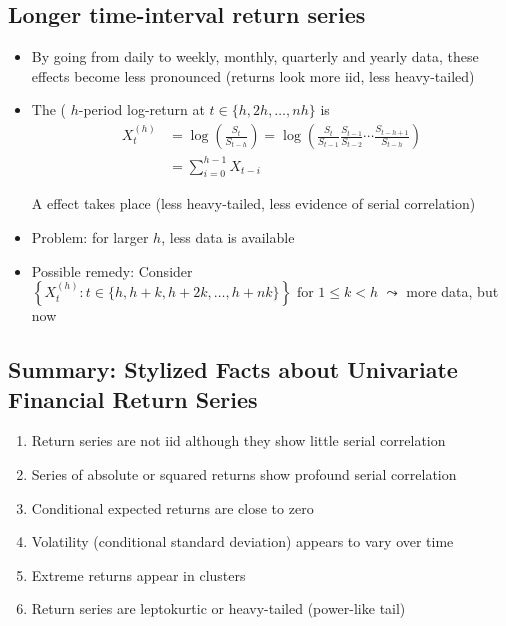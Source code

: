 \subsection*{Longer time-interval return series}
\begin{itemize}[leftmargin=*]
    \item By going from daily to weekly, monthly, quarterly and yearly data, these effects become less pronounced (returns look more iid, less heavy-tailed)
    \item The ( $h$-period log-return at $t \in\{h, 2 h, \ldots, n h\}$ is
$$
\begin{aligned}
    X_{t}^{(h)}&=\log \left(\frac{S_{t}}{S_{t-h}}\right)=\log \left(\frac{S_{t}}{S_{t-1}} \frac{S_{t-1}}{S_{t-2}} \cdots \frac{S_{t-h+1}}{S_{t-h}}\right) \\
    &=\sum_{i=0}^{h-1} X_{t-i}
\end{aligned}
$$

A  effect takes place (less heavy-tailed, less evidence of serial correlation)
    \item Problem: for larger $h$, less data is available
    \item Possible remedy: Consider 
$
\left\{X_{t}^{(h)}: t \in\{h, h+k, h+2 k, \ldots, h+n k\}\right\} \text { for } 1 \leq k<h
$
$\leadsto$ more data, but  now
\end{itemize}







\subsection*{Summary: Stylized Facts about Univariate Financial Return Series}
\begin{enumerate}[label = (U\arabic*), leftmargin=*]
    \item Return series are not iid although they show little serial correlation
    \item Series of absolute or squared returns show profound serial correlation
    \item Conditional expected returns are close to zero
    \item Volatility (conditional standard deviation) appears to vary over time
    \item Extreme returns appear in clusters
    \item Return series are leptokurtic or heavy-tailed (power-like tail)
\end{enumerate}




